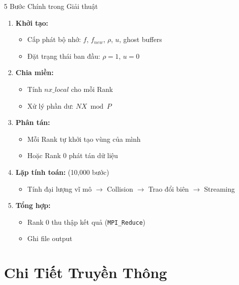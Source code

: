 \documentclass[t, aspectratio=169]{beamer}
\begin{document}
	\begin{frame}{5 Bước Chính trong Giải thuật}
		\begin{enumerate}
			\item \textbf{Khởi tạo:}
			\begin{itemize}
				\item Cấp phát bộ nhớ: $f$, $f_{new}$, $\rho$, $u$, ghost buffers
				\item Đặt trạng thái ban đầu: $\rho=1$, $u=0$
			\end{itemize}
			
			\item \textbf{Chia miền:}
			\begin{itemize}
				\item Tính $nx\_local$ cho mỗi Rank
				\item Xử lý phần dư: $NX \bmod P$
			\end{itemize}
			
			\item \textbf{Phân tán:}
			\begin{itemize}
				\item Mỗi Rank tự khởi tạo vùng của mình
				\item Hoặc Rank 0 phát tán dữ liệu
			\end{itemize}
			
			\item \textbf{Lặp tính toán:} (10,000 bước)
			\begin{itemize}
				\item Tính đại lượng vĩ mô $\to$ Collision $\to$ \alert{Trao đổi biên} $\to$ Streaming
			\end{itemize}
			
			\item \textbf{Tổng hợp:}
			\begin{itemize}
				\item Rank 0 thu thập kết quả (\texttt{MPI\_Reduce})
				\item Ghi file output
			\end{itemize}
		\end{enumerate}
	\end{frame}
	
	\section{Chi Tiết Truyền Thông}
	
\end{document}
